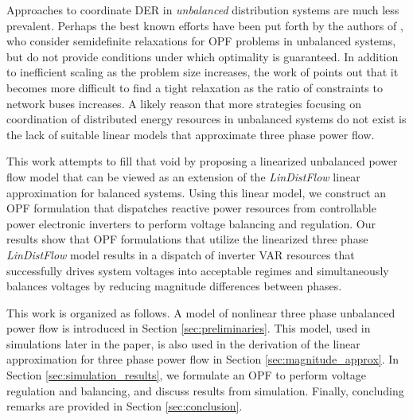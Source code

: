 Approaches to coordinate DER in \emph{unbalanced} distribution systems are much less prevalent.  Perhaps the best known efforts have been put forth by the authors of \cite{dall2012optimization}, who consider semidefinite relaxations for OPF problems in unbalanced systems, but do not provide conditions under which optimality is guaranteed.  In addition to inefficient scaling as the problem size increases, the work of \cite{bitar2014} points out that it becomes more difficult to find a tight relaxation as the ratio of constraints to network buses increases.  A likely reason that more strategies focusing on coordination of distributed energy resources in unbalanced systems do not exist is the lack of suitable linear models that approximate three phase power flow. 

This work attempts to fill that void by proposing a linearized unbalanced power flow model that can be viewed as an extension of the \emph{LinDistFlow} \cite{baran1989optimal} linear approximation for balanced systems.  Using this linear model, we construct an OPF formulation that dispatches reactive power resources from controllable power electronic inverters to perform voltage balancing and regulation.  Our results show that OPF formulations that utilize the linearized three phase \emph{LinDistFlow} model results in a dispatch of inverter VAR resources that successfully drives system voltages into acceptable regimes and simultaneously balances voltages by reducing magnitude differences between phases.

This work is organized as follows. A model of nonlinear three phase unbalanced power flow is introduced in Section \ref{sec:preliminaries}. This model, used in simulations later in the paper, is also used in the derivation of the linear approximation for three phase power flow in Section \ref{sec:magnitude_approx}. In Section \ref{sec:simulation_results}, we formulate an OPF to perform voltage regulation and balancing, and discuss results from simulation.  Finally, concluding remarks are provided in Section \ref{sec:conclusion}.